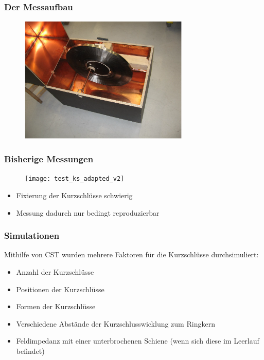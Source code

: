 \documentclass[accentcolor=tud9b, colorbacktitle, inverttitle]{tudbeamer}
\begin{document}
\begin{frame}\frametitle{Der Messaufbau}
\vspace{-2em}
	\begin{figure}[h]
		\centering
		\includegraphics[width=0.72\textwidth]{opentest}
	\end{figure}
\end{frame}




\begin{frame}\frametitle{Bisherige Messungen}
\begin{multicols}{2}
	\vspace{-2em}
	\begin{figure}[h]
		\centering
		\texttt{[image: test\_ks\_adapted\_v2]}
	\end{figure}
	\vfill\null
	\columnbreak
	\begin{itemize}
		\item Fixierung der Kurzschl\"usse schwierig
		\item Messung dadurch nur bedingt reproduzierbar
	\end{itemize}

\end{multicols}
\end{frame}




\begin{frame}\frametitle{Simulationen}
Mithilfe von CST wurden mehrere Faktoren f\"ur die Kurzschl\"usse durchsimuliert:
\begin{itemize}
	\item Anzahl der Kurzschl\"usse
	\item Positionen der Kurzschl\"usse
	\item Formen der Kurzschl\"usse
	\item Verschiedene Abst\"ande der Kurzschlusswicklung zum Ringkern
	\item Feldimpedanz mit einer unterbrochenen Schiene (wenn sich diese im Leerlauf befindet)
\end{itemize}
\end{frame}
\end{document}
